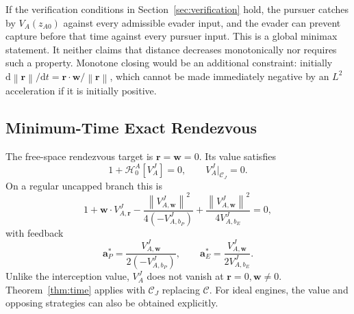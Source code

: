 \documentclass[journal,a4paper]{IEEEtran}
\newcommand{\C}{\mathcal C}
\newcommand{\HH}{\mathcal H}
\newcommand{\norm}[1]{\left\|#1\right\|}
\newcommand{\dd}{\mathrm d}
\begin{document}
If the verification conditions in Section~\ref{sec:verification} hold, the pursuer catches by $V_A(z_{A0})$ against every admissible evader input, and the evader can prevent capture before that time against every pursuer input. This is a global minimax statement. It neither claims that distance decreases monotonically nor requires such a property. Monotone closing would be an additional constraint: initially $\dd\norm{\mathbf r}/\dd t=\mathbf r\cdot\mathbf w/\norm{\mathbf r}$, which cannot be made immediately negative by an $L^2$ acceleration if it is initially positive.

\subsection{Minimum-Time Exact Rendezvous}
\label{sec:freeboarding}
The free-space rendezvous target is $\mathbf r=\mathbf w=0$. Its value satisfies
\begin{equation}
 \boxed{1+\HH^A_0[V_A^J]=0,\qquad V_A^J|_{\C_J}=0.}
 \label{eq:A1J}
\end{equation}
On a regular uncapped branch this is
\begin{equation}
 1+\mathbf w\cdot V^J_{A,\mathbf r}
 -\frac{\norm{V^J_{A,\mathbf w}}^2}{4(-V^J_{A,b_P})}
 +\frac{\norm{V^J_{A,\mathbf w}}^2}{4V^J_{A,b_E}}=0,
 \label{eq:A1Jexpanded}
\end{equation}
with feedback
\begin{equation}
 \mathbf a_P^*=\frac{V^J_{A,\mathbf w}}{2(-V^J_{A,b_P})},\qquad
 \mathbf a_E^*=\frac{V^J_{A,\mathbf w}}{2V^J_{A,b_E}}.
 \label{eq:A1Jfeedback}
\end{equation}
Unlike the interception value, $V_A^J$ does not vanish at $\mathbf r=0,\mathbf w\ne0$. Theorem~\ref{thm:time} applies with $\C_J$ replacing $\C$. For ideal engines, the value and opposing strategies can also be obtained explicitly.
\end{document}
